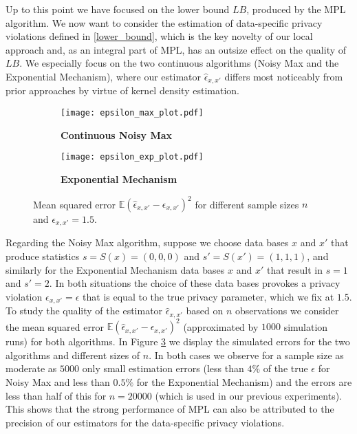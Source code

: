 \documentclass[conference]{IEEEtran}
\begin{document}
Up to this point we have focused on the lower bound $LB$, produced by the MPL algorithm. We now want to consider the estimation of data-specific privacy violations defined in \eqref{lower_bound}, which is the key novelty of our local approach and, as an integral part of MPL, has an outsize effect on the quality of $LB$.
We especially focus on the two continuous algorithms (Noisy Max and the Exponential Mechanism), where our estimator $\hat{\epsilon}_{x,x'}$ differs most noticeably from prior approaches by virtue of kernel density estimation. 


\begin{figure}[H]
\begin{subfigure}[c]{.48\linewidth}
\centering
\caption{\textbf{Continuous Noisy Max}}
\texttt{[image: epsilon\_max\_plot.pdf]}
\label{LB_noisy_plot}
\end{subfigure}\quad
\begin{subfigure}[c]{.48\linewidth}
\centering
\caption{\textbf{Exponential Mechanism}}
\texttt{[image: epsilon\_exp\_plot.pdf]}
\label{LB_svt_plot}
\end{subfigure}\caption{Mean squared error $\mathbb{E}(\hat \epsilon_{x,x'}- \epsilon_{x,x'})^2 $ for different sample sizes $n$ and $\epsilon_{x,x'}=1.5$.}  \label{Figure_approximation}
\end{figure}






Regarding the Noisy Max algorithm, suppose we choose data bases $x$ and $x'$ that produce statistics  $s = S(x) = (0,0,0)$ and $s' = S(x') =(1,1,1)$, and similarly for the Exponential Mechanism data bases $x$ and $x'$ that result in $s=1$ and $s' = 2$. In both situations  the choice of these data bases  provokes a privacy violation $\epsilon_{x,x'}=\epsilon$ that is equal to the true privacy parameter, which we fix at $1.5$. \\
To study the quality of the estimator $\hat{\epsilon}_{x,x'}$ based on $n$ observations we consider the mean squared error $\mathbb{E}(\hat \epsilon_{x,x'}- \epsilon_{x,x'})^2 $ (approximated by $1000$ simulation runs) for both algorithms. In Figure \ref{Figure_approximation} we display the simulated errors for the two algorithms and different sizes of $n$. In both cases we observe for a sample size as moderate as $5000$ only small estimation errors (less than $4\%$ of the true $\epsilon$ for Noisy Max and less than $0.5 \%$ for the Exponential Mechanism) and the errors are less than half of this for $n=20000$ (which is used in our previous experiments). This shows that the strong performance of MPL can also be attributed to the precision of our estimators for the data-specific privacy violations.
\end{document}
